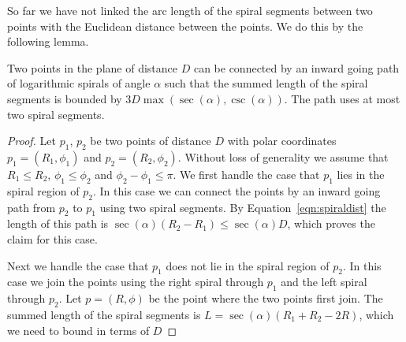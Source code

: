 \documentclass{journalA4}
\begin{document}
So far we have not linked the arc length of the spiral segments between two points with the Euclidean distance between the points. We do this by the following lemma.
\begin{lemma}
Two points in the plane of distance $D$ can be connected by an inward going path of logarithmic spirals of angle $\alpha$ such that the summed length of the spiral segments is bounded by $3 D \max (\sec (\alpha), \csc (\alpha))$. The path uses at most two spiral segments.
\end{lemma}
\begin{proof}
Let $p_1$, $p_2$ be two points of distance $D$ with polar coordinates $p_1 = (R_1,\phi_1)$ and $p_2 = (R_2,\phi_2)$. Without loss of generality we assume that $R_1 \leq R_2$, $\phi_1 \leq \phi_2$ and $\phi_2 - \phi_1 \leq \pi$. We first handle the case that $p_1$ lies in the spiral region of $p_2$. In this case we can connect the points by an inward going path from $p_2$ to $p_1$ using two spiral segments. By Equation~\ref{eqn:spiraldist} the length of this path is $\sec(\alpha) (R_2-R_1) \leq \sec(\alpha) D$, which proves the claim for this case.

Next we handle the case that $p_1$ does not lie in the spiral region of $p_2$. In this case we join the points using the right spiral through $p_1$ and the left spiral through $p_2$. Let $p = (R, \phi)$ be the point where the two points first join. The summed length of the spiral segments is $L = \sec (\alpha) (R_1 + R_2 - 2R)$, which we need to bound in terms of $D$


\end{proof}
\end{document}
